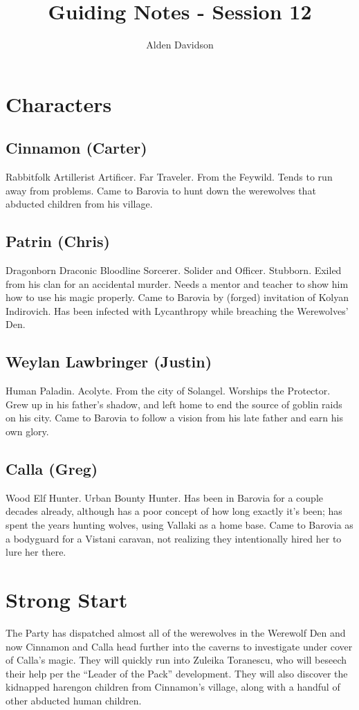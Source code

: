 \documentclass[a4paper,11pt]{article}
\title{Guiding Notes - Session 12}
\author{Alden Davidson}
\begin{document}
\maketitle
\tableofcontents

\pagebreak
\section{Characters}
\label{sec:Characters}
\subsection{Cinnamon (Carter)}
  Rabbitfolk Artillerist Artificer. Far Traveler. From the Feywild. Tends to run away from problems. Came to
  Barovia to hunt down the werewolves that abducted children from his village.
\subsection{Patrin (Chris)}
  Dragonborn Draconic Bloodline Sorcerer. Solider and Officer. Stubborn. Exiled from his clan for an accidental 
  murder. Needs a mentor and teacher to show him how to use his magic properly.  Came to Barovia by (forged)
  invitation of Kolyan Indirovich. Has been infected with Lycanthropy while breaching the Werewolves' Den.
\subsection{Weylan Lawbringer (Justin)}
  Human Paladin. Acolyte. From the city of Solangel. Worships the Protector. Grew up in his father's shadow, and 
  left home to end the source of goblin raids on his city. Came to Barovia to follow a vision from his late 
  father and earn his own glory.
\subsection{Calla (Greg)}
  Wood Elf Hunter. Urban Bounty Hunter. Has been in Barovia for a couple decades already, although has a poor 
  concept of how long exactly it's been; has spent the years hunting wolves, using Vallaki as a home base. Came to 
  Barovia as a bodyguard for a Vistani caravan, not realizing they intentionally hired her to lure her there.

\pagebreak
\section{Strong Start}
\label{sec:StrongStart}
The Party has dispatched almost all of the werewolves in the Werewolf Den and now Cinnamon and Calla head further 
into the caverns to investigate under cover of Calla's magic. They will quickly run into Zuleika Toranescu, who 
will beseech their help per the ``Leader of the Pack'' development. They will also discover the kidnapped harengon 
children from Cinnamon's village, along with a handful of other abducted human children.
\end{document}
